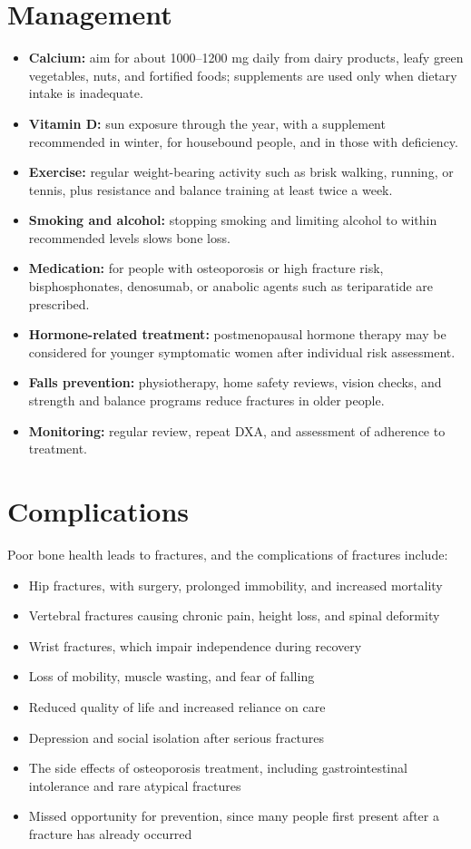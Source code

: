 \section*{Management}
\begin{itemize}
    \item \textbf{Calcium:} aim for about 1000--1200 mg daily from dairy products, leafy green vegetables, nuts, and fortified foods; supplements are used only when dietary intake is inadequate.
    \item \textbf{Vitamin D:} sun exposure through the year, with a supplement recommended in winter, for housebound people, and in those with deficiency.
    \item \textbf{Exercise:} regular weight-bearing activity such as brisk walking, running, or tennis, plus resistance and balance training at least twice a week.
    \item \textbf{Smoking and alcohol:} stopping smoking and limiting alcohol to within recommended levels slows bone loss.
    \item \textbf{Medication:} for people with osteoporosis or high fracture risk, bisphosphonates, denosumab, or anabolic agents such as teriparatide are prescribed.
    \item \textbf{Hormone-related treatment:} postmenopausal hormone therapy may be considered for younger symptomatic women after individual risk assessment.
    \item \textbf{Falls prevention:} physiotherapy, home safety reviews, vision checks, and strength and balance programs reduce fractures in older people.
    \item \textbf{Monitoring:} regular review, repeat DXA, and assessment of adherence to treatment.
\end{itemize}

\section*{Complications}
Poor bone health leads to fractures, and the complications of fractures include:
\begin{itemize}
    \item Hip fractures, with surgery, prolonged immobility, and increased mortality
    \item Vertebral fractures causing chronic pain, height loss, and spinal deformity
    \item Wrist fractures, which impair independence during recovery
    \item Loss of mobility, muscle wasting, and fear of falling
    \item Reduced quality of life and increased reliance on care
    \item Depression and social isolation after serious fractures
    \item The side effects of osteoporosis treatment, including gastrointestinal intolerance and rare atypical fractures
    \item Missed opportunity for prevention, since many people first present after a fracture has already occurred
\end{itemize}

